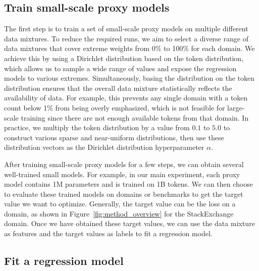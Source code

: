\documentclass{article}
\theoremstyle{definition}
\theoremstyle{remark}
\begin{document}
\subsection{Train small-scale proxy models}

The first step is to train a set of small-scale proxy models on multiple different data mixtures.
To reduce the required runs, we aim to select a diverse range of data mixtures that cover extreme weights from 0\% to 100\% for each domain.
We achieve this by using a Dirichlet distribution based on the token distribution, which allows us to sample a wide range of values and expose the regression models to various extremes.
Simultaneously, basing the distribution on the token distribution ensures that the overall data mixture statistically reflects the availability of data.
For example, this prevents any single domain with a token count below 1\% from being overly emphasized, which is not feasible for large-scale training since there are not enough available tokens from that domain.
In practice, we multiply the token distribution by a value from $0.1$ to $5.0$ to construct various sparse and near-uniform distributions, then use these distribution vectors as the Dirichlet distribution hyperparameter $\alpha$. 

After training small-scale proxy models for a few steps, we can obtain several well-trained small models. For example, in our main experiment, each proxy model contains 1M parameters and is trained on 1B tokens. We can then choose to evaluate these trained models on domains or benchmarks to get the target value we want to optimize.
Generally, the target value can be the loss on a domain, as shown in Figure~\ref{fig:method_overview} for the StackExchange domain.
Once we have obtained these target values, we can use the data mixture as features and the target values as labels to fit a regression model.

\subsection{Fit a regression model}
\end{document}
